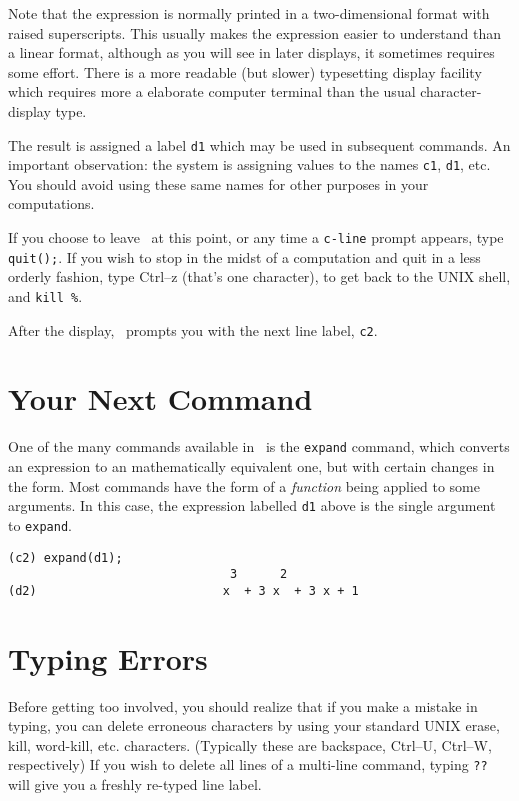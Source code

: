 Note that the expression is normally printed in a two-dimensional
format with raised superscripts.  This usually makes the expression
easier to understand than a linear format, although as you will see in later displays,
it sometimes requires some effort.
There is a more readable (but slower) typesetting display facility which
requires more a elaborate computer terminal than the usual character-display
type.

The result is assigned a label {\tt d1} which may be used
in subsequent commands. An important observation: the system is assigning
values to the names {\tt c1}, {\tt d1}, etc.  You should avoid using these same names
for other purposes in your computations.

If you choose to leave \Max\ at this point, or any time a {\tt c-line}
prompt appears, type {\tt  quit();}.
If you wish to stop in the midst of a computation and quit in a less orderly fashion, type
Ctrl--z (that's one character), to get back to the UNIX shell, and {\tt  kill \%}.

After the display, \Max\ prompts you with the next line label, {\tt c2}.

\section{Your Next Command}

One of the many commands available in \Max\ is the {\tt expand}
command, which converts an expression to
an mathematically equivalent one, but with certain changes in the form.
Most commands have the form of a {\it function} being applied to
some arguments.  In this case, the expression labelled {\tt d1}
above is the single argument to {\tt expand}.
\begin{verbatim}
(c2) expand(d1);
                               3      2
(d2)                          x  + 3 x  + 3 x + 1
\end{verbatim}

\section{Typing Errors}

Before getting too involved, you should realize
that if you make a mistake in typing, you can delete erroneous
characters by using your standard UNIX erase, kill, word-kill, etc. characters.
(Typically these are backspace, Ctrl--U, Ctrl--W, respectively)
If you wish to delete all lines of a multi-line command, typing {\tt ??}
will give you a freshly re-typed line label.

